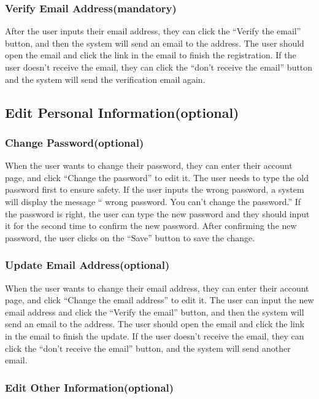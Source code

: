 \documentclass[conference]{IEEEtran}
\begin{document}
\subsubsection{ Verify Email Address(mandatory) }

After the user inputs their email address, they can click the “Verify the 
email” button, and then the system will send an email to the address. The user
should open the email and click the link in the email to finish the registration. If 
the user doesn't receive the email, they can click the “don’t receive the email” 
button and the system will send the verification email again.

\subsection{ Edit Personal Information(optional) }

\subsubsection{ Change Password(optional) }

When the user wants to change their password, they can enter their 
account page, and click “Change the password” to edit it. The user needs to 
type the old password first to ensure safety. If the user inputs the wrong 
password, a system will display the message “ wrong password. You can’t 
change the password.” If the password is right, the user can type the new 
password and they should input it for the second time to confirm the new
password. After confirming the new password, the user clicks on the “Save”
button to save the change.

\subsubsection{ Update Email Address(optional) }

When the user wants to change their email address, they can enter their 
account page, and click “Change the email address” to edit it. The user can 
input the new email address and click the “Verify the email” button, and then the 
system will send an email to the address. The user should open the email and 
click the link in the email to finish the update. If the user doesn't receive the 
email, they can click the “don’t receive the email” button, and the system will 
send another email.

\subsubsection{ Edit Other Information(optional) }
\end{document}
